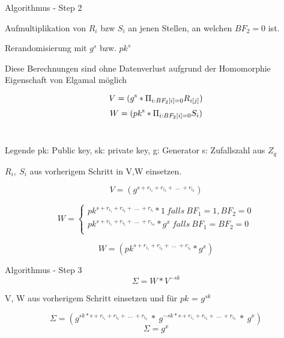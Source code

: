 \documentclass{beamer}
\begin{document}
	\begin{frame}{Algorithmus - Step 2}
		
		\begin{arrowlist}
			\item Aufmultiplikation  von $R_i$ bzw $S_i$ an jenen Stellen, an welchen $BF_2 = 0$ ist.
			\item Rerandomisierung mit $g^s$ bzw. $pk^s$ 
			\item Diese Berechnungen sind ohne Datenverlust aufgrund der Homomorphie Eigenschaft von Elgamal möglich
		\end{arrowlist}	
		$$ V = (g \textsuperscript{s} * \Pi_{i:BF_{2}[i] = 0} R_{i[j]} )$$
		$$ W = (pk \textsuperscript{s} * \Pi_{i:BF_{2}[i] = 0} S_{i} )$$ \\
		
		
		\begin{block}{Legende}
			pk: Public key, sk: private key, g: Generator s: Zufallszahl aus $Z_q$
		\end{block}
		
	\end{frame}
	
	\begin{frame}
		\begin{arrowlist}
			\item 	 $R_{i}, \  S_{i}$ aus vorherigem Schritt in V,W einsetzen.
			
		\end{arrowlist}
		
		$$ V = (g^{s + r_{i_{1}} + r_{i_{2}} + \ ...\ +r_{i_{k}}})$$
		
		\[
		W =\left\{
		\begin{array}{ll}
		pk^{s + r_{i_{1}} + r_{i_{2}} + \ ...\ +r_{i_{l}}}*1 \ falls \ BF_{1} = 1,BF_{2} = 0 \\
		pk^{s + r_{i_{1}} + r_{i_{2}} + \ ...\ +r_{i_{m}}}*g^{x} \ falls \ BF_{1} = BF_{2} = 0\\
		\end{array}
		\right.
		\]
		
		$$ W= (pk^{s + r_{i_{1}} + r_{i_{2}} + \ ...\ +r_{i_{k}}}* g^x)$$
		
	\end{frame}
	
	
	\begin{frame}{Algorithmus - Step 3}
		$$\Sigma = W * V^{-sk}$$
		\begin{arrowlist}
			\item V, W aus vorherigem Schritt einsetzen und für $pk$ = $g^{sk}$ 
		\end{arrowlist}
		\vskip 0.1cm 
		
		$$\Sigma = (g^{sk * s + r_{i_{1}} + r_{i_{2}} + \ ...\ +r_{i_{k}}} \ * \ g^{-sk * s + r_{i_{1}} + r_{i_{2}} + \ ...\ +r_{i_{k}}} \ * \ g^x) $$
		$$\Sigma = g^x$$
	\end{frame}
	
\end{document}
